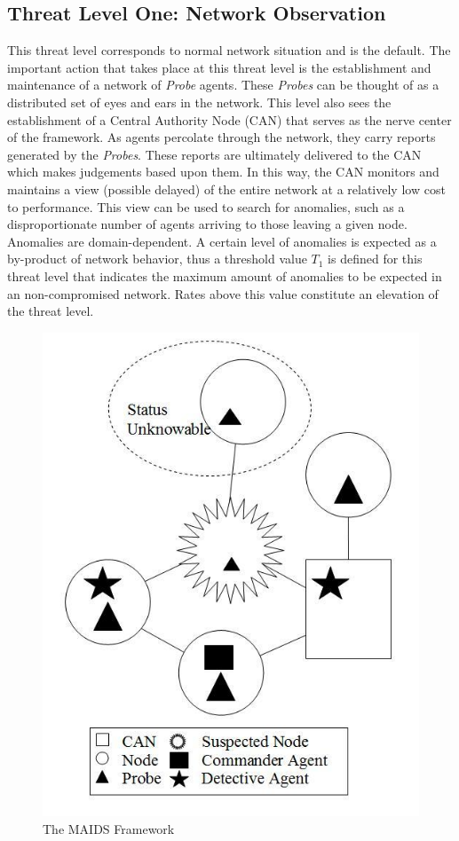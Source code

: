 \documentclass{acm_proc_article-sp}
\begin{document}
\subsection{Threat Level One: Network Observation}
This threat level corresponds to normal network situation and is the default.  The important action that takes place at this threat level is the establishment and maintenance of a network of {\it Probe} agents.  These {\it Probes} can be thought of as a distributed set of eyes and ears in the network.  This level also sees the establishment of a Central Authority Node (CAN) that serves as the nerve center of the framework.  As agents percolate through the network, they carry reports generated by the {\it Probes}.  These reports are ultimately delivered to the CAN which makes judgements based upon them.  In this way, the CAN monitors and maintains a view (possible delayed) of the entire network at a relatively low cost to performance.  This view can be used to search for anomalies, such as a disproportionate number of agents arriving to those leaving a given node.  Anomalies are domain-dependent.  A certain level of anomalies is expected as a by-product of network behavior, thus a threshold value $T_1$ is defined for this threat level that indicates the maximum amount of anomalies to be expected in an non-compromised network.  Rates above this value constitute an elevation of the threat level.

\begin{figure}
\centering
\includegraphics[scale=0.45]{maids}
\caption{The MAIDS Framework}
\label{fig:framework}
\end{figure}
\end{document}
